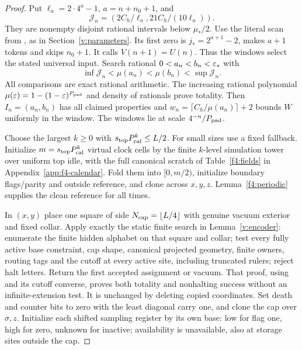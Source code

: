 \begin{proof}
Put \(\ell_a=2\cdot4^a-1\), \(a=n+n_0+1\), and
\[
 \mathcal J_n=(2C_h/\ell_a,21C_h/(10\ell_a)).
\]
They are nonempty disjoint rational intervals below \(\mu_*/2\).
Use the literal scan from \cite[Lemmas~4.1\nobreakdash--4.2]{DMNoise2026},
as in Section~\ref{v:parameters}. Its first zero is
\(j_*=2^{a+1}-2\), makes \(a+1\) tokens and skips \(n_0+1\).
It calls \(V(n+1)=U(n)\). Thus the windows select the stated universal
input. Search rational \(0<a_n<b_n<\varepsilon_*\) with
\[
 \inf \mathcal J_n<\mu(a_n)<\mu(b_n)<\sup \mathcal J_n.
\]
All comparisons are exact rational arithmetic. The increasing rational
polynomial \mbox{\(\mu(\varepsilon)=1-(1-\varepsilon)^{P_{\rm pad}}\)} and density of
rationals prove totality. Then \(I_n=(a_n,b_n)\) has all claimed
properties and \(w_n=\lceil C_h/\mu(a_n)\rceil+2\) bounds \(W\)
uniformly in the window. The windows lie at scale
\(4^{-n}/P_{\rm pad}\).

Choose the largest \(k\ge0\) with \(s_{\rm top}P_{\rm cal}^k\le L/2\).
For small sizes use a fixed fallback. Initialize \(m=s_{\rm top}P_{\rm cal}^k\)
virtual clock cells by the finite \(k\)-level simulation tower over
uniform top idle, with the full canonical scratch of
Table~\ref{f4:fields} in Appendix~\ref{app:f4-calendar}. Fold them into \([0,m/2)\), initialize boundary
flags/parity and outside reference, and clone across \(x,y,z\).
Lemma~\ref{f4:periodic} supplies the clean reference for all times.

In \((x,y)\) place one square of side \(N_{\rm cap}=\lfloor L/4\rfloor\)
with genuine vacuum exterior and fixed collar. Apply exactly the
static finite search in Lemma~\ref{v:encoder}: enumerate the finite
hidden alphabet on that square and collar; test every fully active
base constraint, cap shape, canonical projected geometry, finite owners,
routing tags and the cutoff at every active site, including truncated
rulers; reject halt letters. Return the first accepted assignment or
vacuum. That proof, using \cite[Lemma~11.2]{DMNoise2026} and its cutoff
converse, proves both totality and nonhalting success without an
infinite-extension test. It is unchanged by deleting copied coordinates.
Set death and counter bits to zero with the least diagonal carry one,
and clone the cap over \(\sigma,z\). Initialize each shifted sampling register
by its own base: low for flag one, high for zero, unknown for inactive;
availability is unavailable, also at storage sites outside the cap.


\end{proof}

